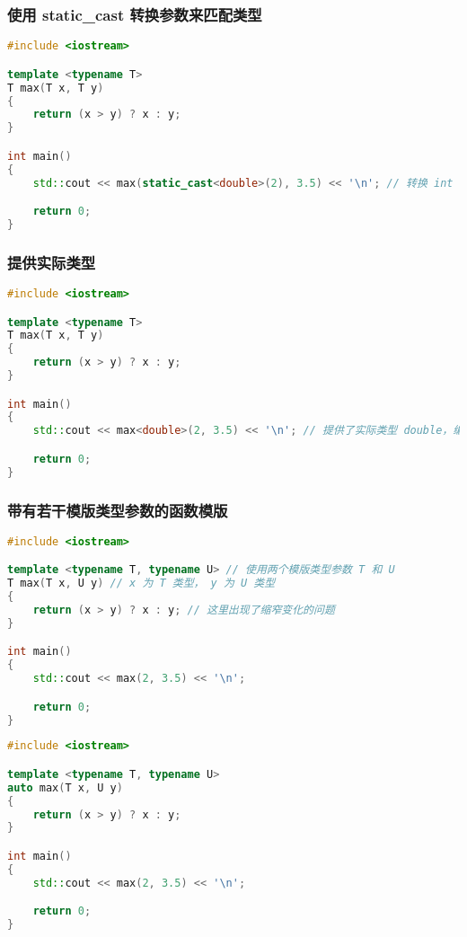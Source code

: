 \documentclass[../../LearnCpp.tex]{subfiles}
\begin{document}

\subsubsection*{使用 static\_cast 转换参数来匹配类型}

\begin{lstlisting}[language=C++]
#include <iostream>

template <typename T>
T max(T x, T y)
{
    return (x > y) ? x : y;
}

int main()
{
    std::cout << max(static_cast<double>(2), 3.5) << '\n'; // 转换 int 至 double 用以调用 max(double, double)

    return 0;
}
\end{lstlisting}

\subsubsection*{提供实际类型}

\begin{lstlisting}[language=C++]
#include <iostream>

template <typename T>
T max(T x, T y)
{
    return (x > y) ? x : y;
}

int main()
{
    std::cout << max<double>(2, 3.5) << '\n'; // 提供了实际类型 double，编译器不再使用模版类型推导

    return 0;
}
\end{lstlisting}

\subsubsection*{带有若干模版类型参数的函数模版}

\begin{lstlisting}[language=C++]
#include <iostream>

template <typename T, typename U> // 使用两个模版类型参数 T 和 U
T max(T x, U y) // x 为 T 类型， y 为 U 类型
{
    return (x > y) ? x : y; // 这里出现了缩窄变化的问题
}

int main()
{
    std::cout << max(2, 3.5) << '\n';

    return 0;
}
\end{lstlisting}

\begin{lstlisting}[language=C++]
#include <iostream>

template <typename T, typename U>
auto max(T x, U y)
{
    return (x > y) ? x : y;
}

int main()
{
    std::cout << max(2, 3.5) << '\n';

    return 0;
}
\end{lstlisting}
\end{document}
